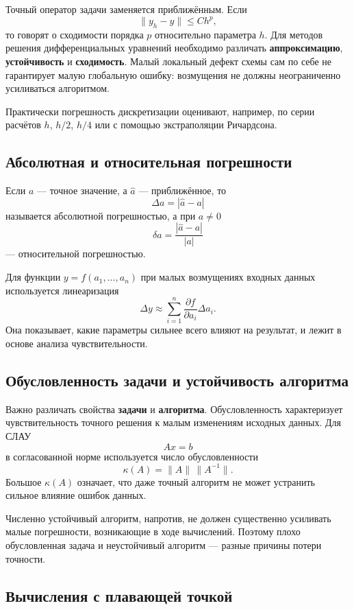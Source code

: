 Точный оператор задачи заменяется приближённым. Если
\[
\|y_h-y\|\le Ch^p,
\]
то говорят о сходимости порядка $p$ относительно параметра $h$.
Для методов решения дифференциальных уравнений необходимо различать
\textbf{аппроксимацию}, \textbf{устойчивость} и \textbf{сходимость}.
Малый локальный дефект схемы сам по себе не гарантирует малую глобальную
ошибку: возмущения не должны неограниченно усиливаться алгоритмом.

Практически погрешность дискретизации оценивают, например, по серии расчётов
$h$, $h/2$, $h/4$ или с помощью экстраполяции Ричардсона.

\subsection{Абсолютная и относительная погрешности}

Если $a$ --- точное значение, а $\widehat a$ --- приближённое, то
\[
\Delta a=|\widehat a-a|
\]
называется абсолютной погрешностью, а при $a\ne0$
\[
\delta a=\frac{|\widehat a-a|}{|a|}
\]
--- относительной погрешностью.

Для функции $y=f(a_1,\ldots,a_n)$ при малых возмущениях входных данных
используется линеаризация
\[
\Delta y\approx
\sum_{i=1}^n
\frac{\partial f}{\partial a_i}\Delta a_i.
\]
Она показывает, какие параметры сильнее всего влияют на результат, и
лежит в основе анализа чувствительности.

\subsection{Обусловленность задачи и устойчивость алгоритма}

Важно различать свойства \textbf{задачи} и \textbf{алгоритма}.
Обусловленность характеризует чувствительность точного решения к малым
изменениям исходных данных. Для СЛАУ
\[
Ax=b
\]
в согласованной норме используется число обусловленности
\[
\boxed{\kappa(A)=\|A\|\,\|A^{-1}\|}.
\]
Большое $\kappa(A)$ означает, что даже точный алгоритм не может устранить
сильное влияние ошибок данных.

Численно устойчивый алгоритм, напротив, не должен существенно усиливать
малые погрешности, возникающие в ходе вычислений. Поэтому плохо
обусловленная задача и неустойчивый алгоритм --- разные причины потери
точности.

\subsection{Вычисления с плавающей точкой}

